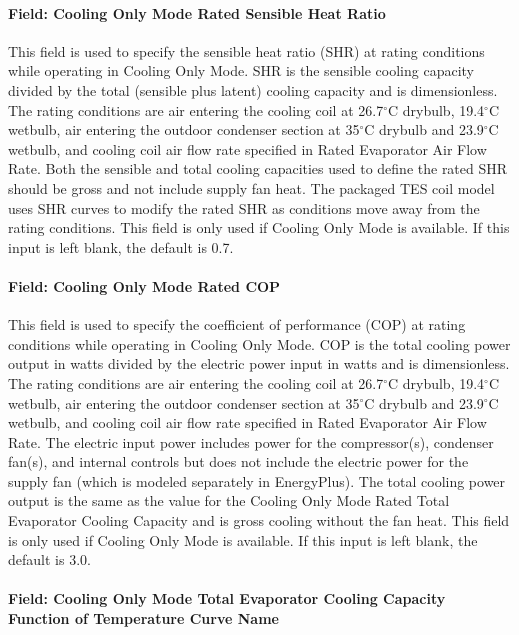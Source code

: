 \paragraph{Field: Cooling Only Mode Rated Sensible Heat Ratio}\label{field-cooling-only-mode-rated-sensible-heat-ratio}

This field is used to specify the sensible heat ratio (SHR) at rating conditions while operating in Cooling Only Mode. SHR is the sensible cooling capacity divided by the total (sensible plus latent) cooling capacity and is dimensionless. The rating conditions are air entering the cooling coil at 26.7$^\circ$C drybulb, 19.4$^\circ$C wetbulb, air entering the outdoor condenser section at 35$^\circ$C drybulb and 23.9$^\circ$C wetbulb, and cooling coil air flow rate specified in Rated Evaporator Air Flow Rate. Both the sensible and total cooling capacities used to define the rated SHR should be gross and not include supply fan heat. The packaged TES coil model uses SHR curves to modify the rated SHR as conditions move away from the rating conditions. This field is only used if Cooling Only Mode is available. If this input is left blank, the default is 0.7.

\paragraph{Field: Cooling Only Mode Rated COP}\label{field-cooling-only-mode-rated-cop}

This field is used to specify the coefficient of performance (COP) at rating conditions while operating in Cooling Only Mode. COP is the total cooling power output in watts divided by the electric power input in watts and is dimensionless. The rating conditions are air entering the cooling coil at 26.7$^\circ$C drybulb, 19.4$^\circ$C wetbulb, air entering the outdoor condenser section at 35$^\circ$C drybulb and 23.9$^\circ$C wetbulb, and cooling coil air flow rate specified in Rated Evaporator Air Flow Rate. The electric input power includes power for the compressor(s), condenser fan(s), and internal controls but does not include the electric power for the supply fan (which is modeled separately in EnergyPlus). The total cooling power output is the same as the value for the Cooling Only Mode Rated Total Evaporator Cooling Capacity and is gross cooling without the fan heat. This field is only used if Cooling Only Mode is available. If this input is left blank, the default is 3.0.

\paragraph{Field: Cooling Only Mode Total Evaporator Cooling Capacity Function of Temperature Curve Name}\label{field-cooling-only-mode-total-evaporator-cooling-capacity-function-of-temperature-curve-name}

